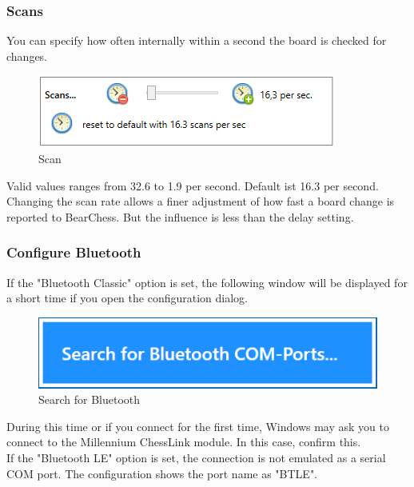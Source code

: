 \documentclass[11pt,a4paper]{article}
\begin{document}
\subsubsection{Scans}
You can specify how often internally within a second the board is checked for changes.\\
\begin{figure}[H]
	\centering
	\includegraphics[scale=1.0]{MillenniumChessLink12.png}
	\caption{Scan}
	\label{fig:MillenniumChessLink12}
\end{figure}
Valid values ranges from 32.6 to 1.9 per second. Default ist 16.3 per second.
Changing the scan rate allows a finer adjustment of how fast a board change is reported to BearChess. But the influence is less than the delay setting.


\subsubsection{Configure Bluetooth} \label{Bluetooth}

If the "Bluetooth Classic" option is set, the following window will be displayed for a short time if you open the configuration dialog.

\begin{figure}[H]
	\centering
	\includegraphics[scale=0.8]{MillenniumChessLink10.png}
	\caption{Search for Bluetooth}
	\label{fig:MillenniumChessLink10}
\end{figure}



During this time or if you connect for the first time, Windows may ask you to connect to the Millennium ChessLink module. In this case, confirm this.\\

If the "Bluetooth LE" option is set, the connection is not emulated as a serial COM port. The configuration shows the port name as "BTLE".
\end{document}
